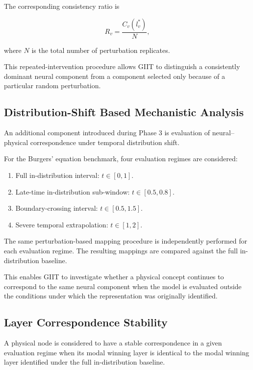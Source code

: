 \documentclass[12pt,singleside,a4paper]{article}
\begin{document}
The corresponding consistency ratio is

\begin{equation}
    R_v
    =
    \frac{C_v(l_v^*)}{N},
\end{equation}

where $N$ is the total number of perturbation replicates.

This repeated-intervention procedure allows GIIT to distinguish a
consistently dominant neural component from a component selected only
because of a particular random perturbation.


\subsection{Distribution-Shift Based Mechanistic Analysis}

An additional component introduced during Phase 3 is evaluation of
neural--physical correspondence under temporal distribution shift.

For the Burgers' equation benchmark, four evaluation regimes are
considered:

\begin{enumerate}
    \item Full in-distribution interval:
    $t \in [0,1]$.
    
    \item Late-time in-distribution sub-window:
    $t \in [0.5,0.8]$.
    
    \item Boundary-crossing interval:
    $t \in [0.5,1.5]$.
    
    \item Severe temporal extrapolation:
    $t \in [1,2]$.
\end{enumerate}

The same perturbation-based mapping procedure is independently
performed for each evaluation regime. The resulting mappings are
compared against the full in-distribution baseline.

This enables GIIT to investigate whether a physical concept continues
to correspond to the same neural component when the model is evaluated
outside the conditions under which the representation was originally
identified.


\subsection{Layer Correspondence Stability}

A physical node is considered to have a stable correspondence in a
given evaluation regime when its modal winning layer is identical to
the modal winning layer identified under the full in-distribution
baseline.
\end{document}
